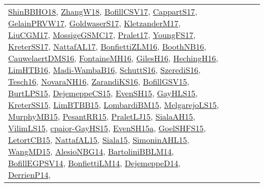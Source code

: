 {\begin{longtable}{llp{6cm}p{6cm}p{6cm}}
\href{articles/ShinBBHO18.pdf}{ShinBBHO18}\cite{ShinBBHO18}, \href{articles/ZhangW18.pdf}{ZhangW18}\cite{ZhangW18}, \href{papers/BofillCSV17.pdf}{BofillCSV17}\cite{BofillCSV17}, \href{papers/CappartS17.pdf}{CappartS17}\cite{CappartS17}, \href{papers/GelainPRVW17.pdf}{GelainPRVW17}\cite{GelainPRVW17}, \href{papers/GoldwaserS17.pdf}{GoldwaserS17}\cite{GoldwaserS17}, \href{papers/KletzanderM17.pdf}{KletzanderM17}\cite{KletzanderM17}, \href{papers/LiuCGM17.pdf}{LiuCGM17}\cite{LiuCGM17}, \href{papers/MossigeGSMC17.pdf}{MossigeGSMC17}\cite{MossigeGSMC17}, \href{papers/Pralet17.pdf}{Pralet17}\cite{Pralet17}, \href{papers/YoungFS17.pdf}{YoungFS17}\cite{YoungFS17}, \href{articles/KreterSS17.pdf}{KreterSS17}\cite{KreterSS17}, \href{articles/NattafAL17.pdf}{NattafAL17}\cite{NattafAL17}, \href{papers/BonfiettiZLM16.pdf}{BonfiettiZLM16}\cite{BonfiettiZLM16}, \href{papers/BoothNB16.pdf}{BoothNB16}\cite{BoothNB16}, \href{papers/CauwelaertDMS16.pdf}{CauwelaertDMS16}\cite{CauwelaertDMS16}, \href{papers/FontaineMH16.pdf}{FontaineMH16}\cite{FontaineMH16}, \href{papers/GilesH16.pdf}{GilesH16}\cite{GilesH16}, \href{papers/HechingH16.pdf}{HechingH16}\cite{HechingH16}, \href{papers/LimHTB16.pdf}{LimHTB16}\cite{LimHTB16}, \href{papers/Madi-WambaB16.pdf}{Madi-WambaB16}\cite{Madi-WambaB16}, \href{papers/SchuttS16.pdf}{SchuttS16}\cite{SchuttS16}, \href{papers/SzerediS16.pdf}{SzerediS16}\cite{SzerediS16}, \href{papers/Tesch16.pdf}{Tesch16}\cite{Tesch16}, \href{articles/NovaraNH16.pdf}{NovaraNH16}\cite{NovaraNH16}, \href{articles/ZarandiKS16.pdf}{ZarandiKS16}\cite{ZarandiKS16}, \href{papers/BofillGSV15.pdf}{BofillGSV15}\cite{BofillGSV15}, \href{papers/BurtLPS15.pdf}{BurtLPS15}\cite{BurtLPS15}, \href{papers/DejemeppeCS15.pdf}{DejemeppeCS15}\cite{DejemeppeCS15}, \href{papers/EvenSH15.pdf}{EvenSH15}\cite{EvenSH15}, \href{papers/GayHLS15.pdf}{GayHLS15}\cite{GayHLS15}, \href{papers/KreterSS15.pdf}{KreterSS15}\cite{KreterSS15}, \href{papers/LimBTBB15.pdf}{LimBTBB15}\cite{LimBTBB15}, \href{papers/LombardiBM15.pdf}{LombardiBM15}\cite{LombardiBM15}, \href{papers/MelgarejoLS15.pdf}{MelgarejoLS15}\cite{MelgarejoLS15}, \href{papers/MurphyMB15.pdf}{MurphyMB15}\cite{MurphyMB15}, \href{papers/PesantRR15.pdf}{PesantRR15}\cite{PesantRR15}, \href{papers/PraletLJ15.pdf}{PraletLJ15}\cite{PraletLJ15}, \href{papers/SialaAH15.pdf}{SialaAH15}\cite{SialaAH15}, \href{papers/VilimLS15.pdf}{VilimLS15}\cite{VilimLS15}, \href{papers/cpaior-GayHS15.pdf}{cpaior-GayHS15}\cite{cpaior-GayHS15}, \href{articles/EvenSH15a.pdf}{EvenSH15a}\cite{EvenSH15a}, \href{articles/GoelSHFS15.pdf}{GoelSHFS15}\cite{GoelSHFS15}, \href{articles/LetortCB15.pdf}{LetortCB15}\cite{LetortCB15}, \href{articles/NattafAL15.pdf}{NattafAL15}\cite{NattafAL15}, \href{articles/Siala15.pdf}{Siala15}\cite{Siala15}, \href{articles/SimoninAHL15.pdf}{SimoninAHL15}\cite{SimoninAHL15}, \href{articles/WangMD15.pdf}{WangMD15}\cite{WangMD15}, \href{papers/AlesioNBG14.pdf}{AlesioNBG14}\cite{AlesioNBG14}, \href{papers/BartoliniBBLM14.pdf}{BartoliniBBLM14}\cite{BartoliniBBLM14}, \href{papers/BofillEGPSV14.pdf}{BofillEGPSV14}\cite{BofillEGPSV14}, \href{papers/BonfiettiLM14.pdf}{BonfiettiLM14}\cite{BonfiettiLM14}, \href{papers/DejemeppeD14.pdf}{DejemeppeD14}\cite{DejemeppeD14}, \href{papers/DerrienP14.pdf}{DerrienP14}\cite{DerrienP14}, 
\end{longtable}}

